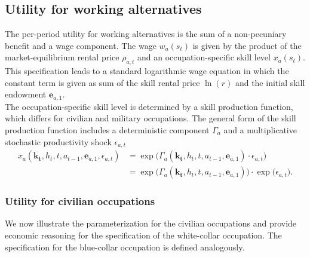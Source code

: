 \subsection{Utility for working alternatives}
The per-period utility for working alternatives is the sum of a non-pecuniary benefit and a wage component. The wage $w_{a}(s_t)$ is given by the product of the market-equilibrium rental price $\rho_{a,t}$ and an occupation-specific skill level $x_{a}(s_t)$. This specification leads to a standard logarithmic wage equation in which the constant term is given as sum of the skill rental price $\ln(r)$ and the initial skill endowment $\bm{e}_{a,1}$.\\

The occupation-specific skill level is determined by a skill production function, which differs for civilian and military occupations. The general form of the skill production function includes a deterministic component $\Gamma_a$ and a multiplicative stochastic productivity shock $\epsilon_{a,t}$
%
\begin{align}\label{eq:OccupationSpecificSkillLevel}
    x_{a}(\bm{k_t}, h_t, t, a_{t-1}, \bm{e}_{a, 1}, \epsilon_{a,t}) & = \exp \big( \Gamma_{a}(\bm{k_t},  h_t, t, a_{t-1}, \bm{e}_{a,1}) \cdot \epsilon_{a,t} \big) \nonumber \\
                & = \exp \big( \Gamma_a(\bm{k_t},  h_t, t, a_{t-1}, \bm{e}_{a,1}) \big) \cdot \exp \big( \epsilon_{a,t} \big).
\end{align}
\subsubsection{Utility for civilian occupations}
We now illustrate the parameterization for the civilian occupations and provide economic reasoning for the specification of the white-collar occupation. The specification for the blue-collar occupation is defined analogously.

